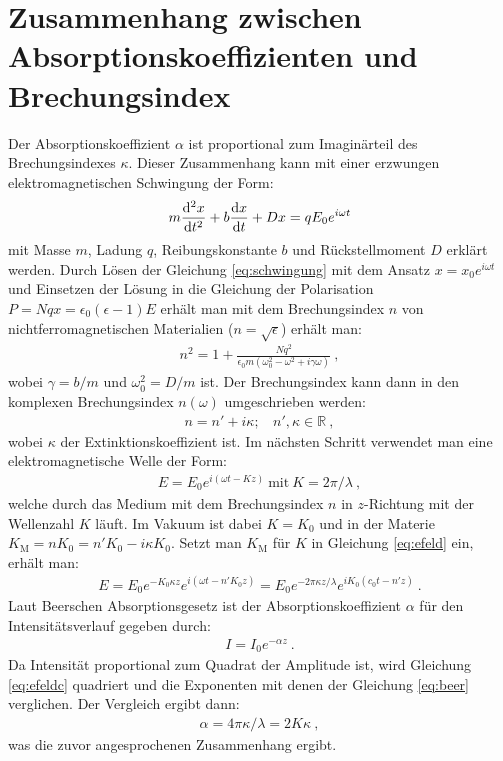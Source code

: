 
\newpage

\section{Zusammenhang zwischen Absorptionskoeffizienten und Brechungsindex}
\label{sec:absorpBrechung}

Der Absorptionskoeffizient $\alpha$ ist proportional zum Imaginärteil des Brechungsindexes $\kappa$.  Dieser Zusammenhang kann mit einer erzwungen elektromagnetischen Schwingung der Form:
\begin{gather}
    m \derivative[2]{x}{t} + b \derivative{x}{t} + Dx = q E_0e^{i\omega t}
    \label{eq:schwingung}
\end{gather}
mit Masse $m$, Ladung $q$, Reibungskonstante $b$ und Rückstellmoment $D$ erklärt werden. Durch Lösen der Gleichung \ref{eq:schwingung} mit dem Ansatz $x=x_0e^{i\omega t}$ und Einsetzen der Lösung in die Gleichung der Polarisation $P = Nqx = \epsilon_0(\epsilon-1)E$ erhält man mit dem Brechungsindex $n$ von nichtferromagnetischen Materialien ($n = \sqrt{\epsilon}$) erhält man:
\begin{gather}
    n^2 = 1 + \frac{Nq^2}{\epsilon_0 m (\omega_0^2 - \omega^2 + i\gamma\omega)}~,
    \label{eq:brechungsindex}
\end{gather}
wobei $\gamma = b/m$ und $\omega_0^2 = D/m$ ist. Der Brechungsindex kann dann in den komplexen Brechungsindex $n(\omega)$ umgeschrieben werden:
\begin{gather}
    n = n' + i\kappa;~~~~ n',\kappa \in \mathbb{R}~,
\end{gather}
wobei $\kappa$ der Extinktionskoeffizient ist. Im nächsten Schritt verwendet man eine elektromagnetische Welle der Form:
\begin{gather}
    E = E_0 e^{i(\omega t - Kz)}~\mathrm{mit}~K = 2\pi/\lambda~,
    \label{eq:efeld}
\end{gather}
welche durch das Medium mit dem Brechungsindex $n$ in $z$-Richtung mit der Wellenzahl $K$ läuft. Im Vakuum ist dabei $K = K_0$ und in der Materie $K_\mathrm{M} = nK_0 = n'K_0 -i\kappa K_0$. Setzt man $K_\mathrm{M}$ für $K$ in Gleichung \ref{eq:efeld} ein, erhält man:
\begin{gather}
    E = E_0e^{-K_0\kappa z}e^{i(\omega t -n'K_0z)} = E_0e^{-2\pi \kappa z/ \lambda}e^{iK_0(c_0 t -n'z)}~.
    \label{eq:efeldc}
\end{gather}
Laut Beerschen Absorptionsgesetz ist der Absorptionskoeffizient $\alpha$ für den Intensitätsverlauf gegeben durch:
\begin{gather}
    I = I_0 e^{-\alpha z}~.
    \label{eq:beer}
\end{gather}
Da Intensität proportional zum Quadrat der Amplitude ist, wird Gleichung \ref{eq:efeldc} quadriert und die Exponenten mit denen der Gleichung \ref{eq:beer} verglichen. Der Vergleich ergibt dann:
\begin{gather}
    \boxed{\alpha = 4 \pi \kappa / \lambda = 2K \kappa}~,
\end{gather}
was die zuvor angesprochenen Zusammenhang ergibt. \cite{DemtroederLaser1}